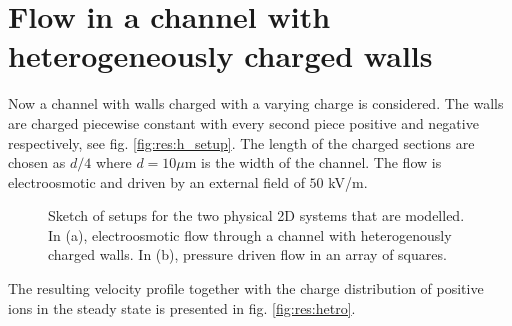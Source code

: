 \section{Flow in a channel with heterogeneously charged walls}

Now a channel with walls charged with a varying charge is
considered. The walls are charged piecewise constant with every second
piece positive and negative respectively, see
fig. \ref{fig:res:h_setup}. The length of the charged sections are
chosen as $d/4$ where $d = 10 \mu$m is the width of the channel. The
flow is electroosmotic and driven by an external field of $50$ kV/m.

\begin{figure}
  \centering
  \hspace{5pt} 
  \caption[Sketch of setups for two physical 2D systems.]{Sketch of
    setups for the two physical 2D systems that are modelled. In (a),
    electroosmotic flow through a channel with heterogenously charged
    walls. In (b), pressure driven flow in an array of squares.}
  \label{fig:res:setup}
\end{figure}

The resulting velocity profile together with the charge distribution
of positive ions in the steady state is presented in
fig. \ref{fig:res:hetro}.

